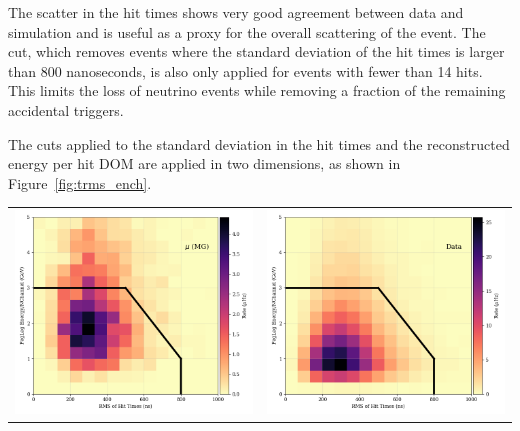 The scatter in the hit times shows very good agreement between data and simulation and is useful as a proxy for the overall scattering of the event.
The cut, which removes events where the standard deviation of the hit times is larger than 800 nanoseconds, is also only applied for events with fewer than 14 hits.
This limits the loss of neutrino events while removing a fraction of the remaining accidental triggers.

The cuts applied to the standard deviation in the hit times and the reconstructed energy per hit DOM are applied in two dimensions, as shown in Figure~\ref{fig:trms_ench}.


\begin{center}
\begin{table}
\begin{tabular}{cc}
    \includegraphics[width=0.45\linewidth]{pegleg_trms_ench_muongun.png} &  
    \includegraphics[width=0.45\linewidth]{pegleg_trms_ench_data.png} \\  


\end{tabular}
\end{table}
\end{center}

